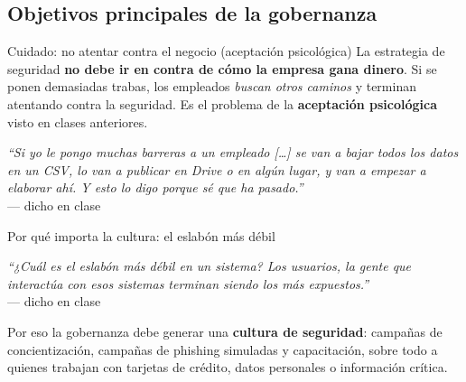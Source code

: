 \documentclass[11pt,a4paper]{article}
\newcommand{\prof}[1]{\par\medskip\noindent\textit{``#1''}\\[-2pt]\hspace*{1em}%
  {\footnotesize\textcolor{black!60}{--- dicho en clase}}\par\medskip\noindent}
\begin{document}
\subsection{Objetivos principales de la gobernanza}

\begin{center}
\end{center}

\begin{warnbox}{Cuidado: no atentar contra el negocio (aceptación psicológica)}
La estrategia de seguridad \textbf{no debe ir en contra de cómo la empresa gana dinero}. Si se
ponen demasiadas trabas, los empleados \emph{buscan otros caminos} y terminan atentando contra
la seguridad. Es el problema de la \textbf{aceptación psicológica} visto en clases anteriores.
\prof{Si yo le pongo muchas barreras a un empleado [\dots] se van a bajar todos los datos en un
CSV, lo van a publicar en Drive o en algún lugar, y van a empezar a elaborar ahí. Y esto lo
digo porque sé que ha pasado.}
\end{warnbox}

\begin{anecbox}{Por qué importa la cultura: el eslabón más débil}
\prof{¿Cuál es el eslabón más débil en un sistema? Los usuarios, la gente que interactúa con
esos sistemas terminan siendo los más expuestos.} Por eso la gobernanza debe generar una
\textbf{cultura de seguridad}: campañas de concientización, campañas de phishing simuladas y
capacitación, sobre todo a quienes trabajan con tarjetas de crédito, datos personales o
información crítica.
\end{anecbox}
\end{document}
